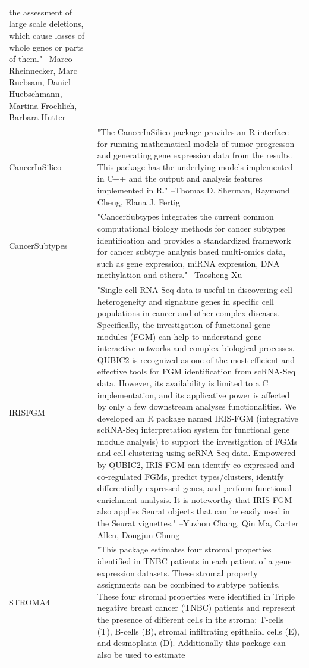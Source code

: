 \begin{longtable}[t]{l>{\raggedright\arraybackslash}p{25em}}
the assessment of large scale deletions, which cause losses of
whole genes or parts of them." --Marco Rheinnecker, Marc Ruebsam, Daniel Huebschmann, Martina Froehlich, Barbara Hutter\\
CancerInSilico & "The CancerInSilico package provides an R interface for
running mathematical models of tumor progresson and generating
gene expression data from the results. This package has the
underlying models implemented in C++ and the output and
analysis features implemented in R." --Thomas D. Sherman, Raymond Cheng, Elana J. Fertig\\
\addlinespace
CancerSubtypes & "CancerSubtypes integrates the current common computational
biology methods for cancer subtypes identification and provides
a standardized framework for cancer subtype analysis based
multi-omics data, such as gene expression, miRNA expression,
DNA methylation and others." --Taosheng Xu\\
IRISFGM & "Single-cell RNA-Seq data is useful in discovering cell
heterogeneity and signature genes in specific cell populations
in cancer and other complex diseases. Specifically, the
investigation of functional gene modules (FGM) can help to
understand gene interactive networks and complex biological
processes. QUBIC2 is recognized as one of the most efficient
and effective tools for FGM identification from scRNA-Seq data.
However, its availability is limited to a C implementation, and
its applicative power is affected by only a few downstream
analyses functionalities. We developed an R package named
IRIS-FGM (integrative scRNA-Seq interpretation system for
functional gene module analysis) to support the investigation
of FGMs and cell clustering using scRNA-Seq data. Empowered by
QUBIC2, IRIS-FGM can identify co-expressed and co-regulated
FGMs, predict types/clusters, identify differentially expressed
genes, and perform functional enrichment analysis. It is
noteworthy that IRIS-FGM also applies Seurat objects that can
be easily used in the Seurat vignettes." --Yuzhou Chang, Qin Ma, Carter Allen, Dongjun Chung\\
STROMA4 & "This package estimates four stromal properties identified
in TNBC patients in each patient of a gene expression datasets.
These stromal property assignments can be combined to subtype
patients. These four stromal properties were identified in
Triple negative breast cancer (TNBC) patients and represent the
presence of different cells in the stroma: T-cells (T), B-cells
(B), stromal infiltrating epithelial cells (E), and desmoplasia
(D). Additionally this package can also be used to estimate

\end{longtable}
